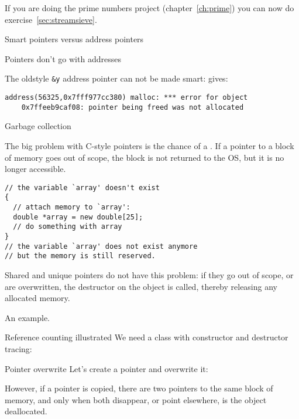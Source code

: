 \begin{exercise}
  If you are doing the prime numbers project (chapter~\ref{ch:prime})
  you can now do exercise~\ref{sec:streamsieve}.
\end{exercise}

 {Smart pointers versus address pointers}

\begin{block}{Pointers don't go with addresses}
  \label{sl:shareaddress}

  The oldstyle \lstinline{&y} address pointer can not be made smart:
  gives:
\begin{verbatim}
address(56325,0x7fff977cc380) malloc: *** error for object
    0x7ffeeb9caf08: pointer being freed was not allocated
\end{verbatim}
\end{block}


 {Garbage collection}

The big problem with C-style pointers is the chance of a
. If a pointer to a block of memory goes out of
scope, the block is not returned to the \ac{OS}, but it is no longer
accessible.
\begin{lstlisting}
// the variable `array' doesn't exist
{
  // attach memory to `array':
  double *array = new double[25];
  // do something with array
}
// the variable `array' does not exist anymore
// but the memory is still reserved.
\end{lstlisting}
Shared and unique
pointers do not have this problem: if they go out of scope, or are
overwritten, the destructor on the object is called, thereby releasing
any allocated memory.

An example.

\begin{block}{Reference counting illustrated}
  \label{sl:construct-destruct-trace}
  We need a class with constructor and destructor tracing:
\end{block}

\begin{block}{Pointer overwrite}
  \label{sl:shared-ptr-overwrite}
  Let's create a pointer and overwrite it:
\end{block}

However, if a pointer is copied, there are two pointers to the same
block of memory, and only when both disappear, or point elsewhere, is
the object deallocated.

